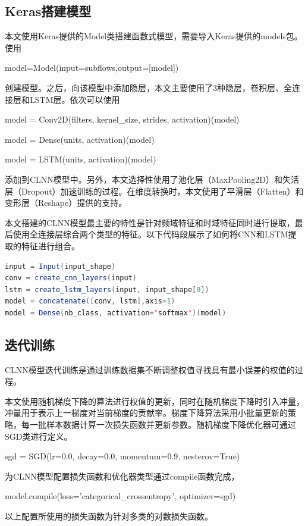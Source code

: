 \subsection{Keras搭建模型}
本文使用Keras提供的Model类搭建函数式模型，需要导入Keras提供的models包。使用
\begin{center}
\monaco
model=Model(input=subflows,output=[model])
\end{center}
创建模型。之后，向该模型中添加隐层，本文主要使用了3种隐层，卷积层、全连接层和LSTM层。依次可以使用
\begin{center}
\monaco
model = Conv2D(filters, kernel\_size, strides, activation)(model)
\end{center}
\begin{center}
\monaco
model = Dense(units, activation)(model)
\end{center}
\begin{center}
\monaco
model = LSTM(units, activation)(model)
\end{center}
添加到CLNN模型中。另外，本文选择性使用了池化层（MaxPooling2D）和失活层（Dropout）加速训练的过程。在维度转换时，本文使用了平滑层（Flatten）和变形层（Reshape）提供的支持。

本文搭建的CLNN模型最主要的特性是针对频域特征和时域特征同时进行提取，最后使用全连接层综合两个类型的特征。以下代码段展示了如何将CNN和LSTM提取的特征进行组合。
\begin{lstlisting}[breaklines=true,language={Java},frame=single,basicstyle=\small\monaco,label={lst:storm},
keywordstyle=\color{blue!70},
rulesepcolor=\color{red!20!green!20!blue!20},escapeinside=``,
xleftmargin=1.5em,xrightmargin=1.5em, aboveskip=1em]
input = Input(input_shape)
conv = create_cnn_layers(input)
lstm = create_lstm_layers(input, input_shape[0])
model = concatenate([conv, lstm],axis=1)
model = Dense(nb_class, activation='softmax')(model)
\end{lstlisting}  

\subsection{迭代训练}
CLNN模型迭代训练是通过训练数据集不断调整权值寻找具有最小误差的权值的过程。

本文使用随机梯度下降的算法进行权值的更新，同时在随机梯度下降时引入冲量，冲量用于表示上一梯度对当前梯度的贡献率。梯度下降算法采用小批量更新的策略，每一批样本数据计算一次损失函数并更新参数。随机梯度下降优化器可通过SGD类进行定义。
\begin{center}
\monaco
sgd = SGD(lr=0.0, decay=0.0, momentum=0.9, nesterov=True)
\end{center}
为CLNN模型配置损失函数和优化器类型通过compile函数完成，
\begin{center}
\monaco
model.compile(loss='categorical\_crossentropy', optimizer=sgd)
\end{center}
以上配置所使用的损失函数为针对多类的对数损失函数。


